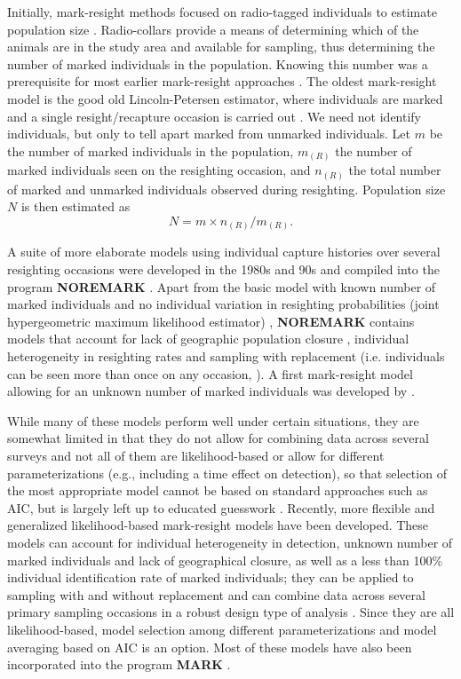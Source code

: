 Initially, mark-resight methods focused on radio-tagged individuals to
estimate population size \citep{white_shenk:2001}. Radio-collars
provide a means of
determining
which of the animals are in the study
area and available for sampling, thus determining the number of marked
individuals in the population. Knowing this number was a prerequisite
for most earlier mark-resight approaches \citep{white:1996}. The
oldest mark-resight model is the good old Lincoln-Petersen estimator,
 where individuals are marked and a single resight/recapture occasion
 is carried out \citep{krebs:1999}. We need not identify individuals,
 but only to tell apart marked from unmarked individuals. Let $m$ be the
 number of marked individuals in the population, $m_{(R)}$ the number
 of marked individuals seen on the resighting occasion, and $n_{(R)}$
 the total number of marked and unmarked individuals observed during
 resighting. Population size $N$ is then estimated as
\[
N = m \times n_{(R)}/m_{(R)}.
\]

A suite of more elaborate models using individual capture histories
over several resighting occasions were developed in the 1980s and
90s and compiled into the program \textbf{NOREMARK} \citep{white:1996}. Apart
from the basic model with known number of marked individuals and no
individual variation in resighting probabilities (joint hypergeometric
maximum likelihood estimator) \citep{bartmann_etal:1987,
  white_garrot:1990, neal:1990, neal_etal:1993}, \textbf{NOREMARK} contains
models that account for lack of geographic population closure
\citep{neal_etal:1993}, individual heterogeneity in resighting rates
and sampling with replacement (i.e. individuals can be seen more than
once on any occasion, \citep{minta_mangel:1989, bowden:1993}). A first
mark-resight model allowing for an unknown number of marked
individuals was developed by \citet{arnason_etal:1991}.

While many of these models perform well under certain situations, they
are somewhat
limited in that they
do not allow for combining data across
several surveys \citep{mcclintock_etal:2006} and not all of them are
likelihood-based or allow for different parameterizations
(e.g., including a time effect on detection), so that
selection of the most appropriate model cannot be based on standard
approaches such as AIC, but is largely left up to educated guesswork
\citep{mcclintock_etal:2006}. Recently, more flexible and generalized
likelihood-based mark-resight models have been developed. These models
can account for individual heterogeneity in detection, unknown number
of marked individuals and lack of geographical closure, as well as a
less than 100\% individual identification rate of marked individuals;
they can be applied to sampling with and without replacement and can
combine data across several primary sampling occasions in a robust
design type of analysis
\citep{mcclintock_etal:2009biometrics,mcclintock_etal:2009mdp}. Since
they are all likelihood-based, model selection among different
parameterizations and model averaging based on AIC is an option. Most
of these models have also been incorporated into the program {\bf MARK}
\citep{mcclintock_white:2010}.

